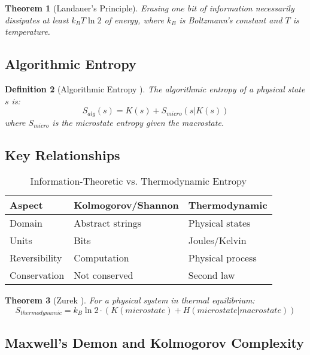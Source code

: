 \documentclass[12pt,a4paper]{report}
\newtheorem{theorem}{Theorem}[chapter]
\newtheorem{definition}[theorem]{Definition}
\begin{document}
\begin{theorem}[Landauer's Principle]
Erasing one bit of information necessarily dissipates at least $k_B T \ln 2$ of energy, where $k_B$ is Boltzmann's constant and $T$ is temperature.
\end{theorem}

\subsection{Algorithmic Entropy}

\begin{definition}[Algorithmic Entropy \cite{zurek1989algorithmic}]
The algorithmic entropy of a physical state $s$ is:
\begin{equation}
S_{alg}(s) = K(s) + S_{micro}(s|K(s))
\end{equation}
where $S_{micro}$ is the microstate entropy given the macrostate.
\end{definition}

\subsection{Key Relationships}

\begin{table}[h]
\centering
\caption{Information-Theoretic vs. Thermodynamic Entropy}
\begin{tabular}{lll}
\toprule
\textbf{Aspect} & \textbf{Kolmogorov/Shannon} & \textbf{Thermodynamic} \\
\midrule
Domain & Abstract strings & Physical states \\
Units & Bits & Joules/Kelvin \\
Reversibility & Computation & Physical process \\
Conservation & Not conserved & Second law \\
\bottomrule
\end{tabular}
\end{table}

\begin{theorem}[Zurek \cite{zurek1989algorithmic}]
For a physical system in thermal equilibrium:
\begin{equation}
S_{thermodynamic} = k_B \ln 2 \cdot (K(microstate) + H(microstate|macrostate))
\end{equation}
\end{theorem}

\subsection{Maxwell's Demon and Kolmogorov Complexity}
\end{document}
